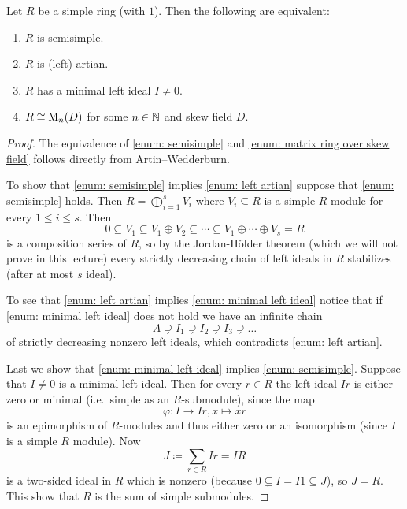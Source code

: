 \begin{thrm}[Wedderburn]
  Let $R$ be a simple ring (with $1$). Then the following are equivalent:
  \begin{enumerate}[label=\emph{\roman*)},leftmargin=*]
    \item \label{enum: semisimple}
      $R$ is semisimple.
    \item \label{enum: left artian}
      $R$ is (left) artian.
    \item \label{enum: minimal left ideal}
      $R$ has a minimal left ideal $I \neq 0$.
    \item \label{enum: matrix ring over skew field}
      $R \cong \operatorname{M}_n(D)$ for some $n \in \mathbb{N}$ and skew field $D$.
  \end{enumerate}
\end{thrm}
\begin{proof}
  The equivalence of \ref{enum: semisimple} and \ref{enum: matrix ring over skew field} follows directly from Artin--Wedderburn.
  
  To show that \ref{enum: semisimple} implies \ref{enum: left artian} suppose that \ref{enum: semisimple} holds.
  Then $R = \bigoplus_{i=1}^s V_i$ where $V_i \subseteq R$ is a simple $R$-module for every $1 \leq i \leq s$.
  Then
  \[
              0
    \subseteq V_1
    \subseteq V_1 \oplus V_2
    \subseteq \dotsb
    \subseteq V_1 \oplus \dotsb \oplus V_s
    =         R
  \]
  is a composition series of $R$, so by the Jordan-Hölder theorem (which we will not prove in this lecture) every strictly decreasing chain of left ideals in $R$ stabilizes (after at most $s$ ideal).
  
  To see that \ref{enum: left artian} implies \ref{enum: minimal left ideal} notice that if \ref{enum: minimal left ideal} does not hold we have an infinite chain
  \[
                A
    \supsetneq  I_1
    \supsetneq  I_2
    \supsetneq  I_3
    \supsetneq  \dotso
  \]
  of strictly decreasing nonzero left ideals, which contradicts \ref{enum: left artian}.
  
  Last we show that \ref{enum: minimal left ideal} implies \ref{enum: semisimple}.
  Suppose that $I \neq 0$ is a minimal left ideal.
  Then for every $r \in R$ the left ideal $Ir$ is either zero or minimal (i.e.\ simple as an $R$-submodule), since the map
  \[
            \varphi
    \colon  I
    \to     Ir,
            x
    \mapsto xr
  \]
  is an epimorphism of $R$-modules and thus either zero or an isomorphism (since $I$ is a simple $R$ module).
  Now
  \[
              J
    \coloneqq \sum_{r \in R} Ir
    =         IR
  \]
  is a two-sided ideal in $R$ which is nonzero (because $0 \subsetneq I = I1 \subseteq J$), so $J = R$.
  This show that $R$ is the sum of simple submodules.
\end{proof}


